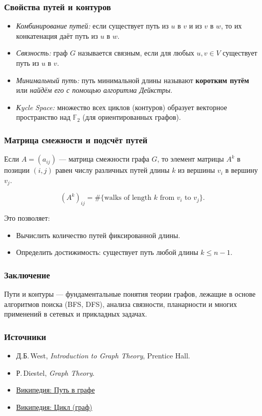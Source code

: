 \subsubsection{Свойства путей и контуров}

\begin{itemize}[leftmargin=*]
  \item \emph{Комбинирование путей:} если существует путь из $u$ в $v$ и из $v$ в $w$, то их конкатенация даёт путь из $u$ в $w$.
  \item \emph{Связность:} граф $G$ называется связным, если для любых $u,v\in V$ существует путь из $u$ в $v$.
  \item \emph{Минимальный путь:} путь минимальной длины называют \textbf{коротким путём} или \emph{найдём его с помощью алгоритма Дейкстры}.
  \item \emph{Кycle Space:} множество всех циклов (контуров) образует векторное пространство над $\mathbb{F}_2$ (для ориентированных графов).
\end{itemize}

\subsubsection{Матрица смежности и подсчёт путей}

Если $A = (a_{ij})$ — матрица смежности графа $G$, то элемент матрицы $A^k$ в позиции $(i,j)$ равен числу различных путей длины $k$ из вершины $v_i$ в вершину $v_j$.

\[
  (A^k)_{ij} = \#\{\text{walks of length }k \text{ from }v_i\text{ to }v_j\}.
\]

Это позволяет:
\begin{itemize}[leftmargin=*]
  \item Вычислить количество путей фиксированной длины.
  \item Определить достижимость: существует путь любой длины $k\le n-1$.
\end{itemize}

\subsubsection{Заключение}

Пути и контуры — фундаментальные понятия теории графов, лежащие в основе алгоритмов поиска (BFS, DFS), анализа связности, планарности и многих применений в сетевых и прикладных задачах.

\subsubsection{Источники}

\begin{itemize}
  \item Д.Б.\,West, \emph{Introduction to Graph Theory}, Prentice Hall.
  \item Р.\,Diestel, \emph{Graph Theory}.
  \item \href{https://ru.wikipedia.org/wiki/Путь_в_графе}{Википедия: Путь в графе}
  \item \href{https://ru.wikipedia.org/wiki/Цикл_в_графе}{Википедия: Цикл (граф)}
\end{itemize}

